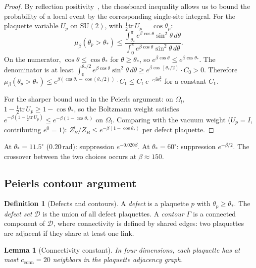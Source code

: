 \documentclass[11pt]{article}
\newtheorem{lemma}[theorem]{Lemma}
\theoremstyle{definition}
\newtheorem{definition}[theorem]{Definition}
\newcommand{\SU}{\mathrm{SU}}
\newcommand{\tr}{\mathrm{tr}}
\begin{document}
\begin{proof}
By reflection positivity~\cite{OS78,FroehlichSimon}, the chessboard
inequality allows us to bound the probability of a local event by
the corresponding single-site integral.  For the plaquette variable
$U_p$ on $\SU(2)$, with $\frac{1}{2}\tr\,U_p=\cos\theta_p$:
\begin{equation}
\mu_\beta(\theta_p>\theta_*)
\le\frac{\int_{\theta_*}^\pi
e^{\beta\cos\theta}\sin^2\theta\,d\theta}
{\int_0^\pi e^{\beta\cos\theta}\sin^2\theta\,d\theta}.
\end{equation}
On the numerator, $\cos\theta\le\cos\theta_*$ for
$\theta\ge\theta_*$, so
$e^{\beta\cos\theta}\le e^{\beta\cos\theta_*}$.
The denominator is at least
$\int_0^{\theta_*/2}e^{\beta\cos\theta}\sin^2\theta\,d\theta
\ge e^{\beta\cos(\theta_*/2)}\cdot C_0>0$.
Therefore
$\mu_\beta(\theta_p>\theta_*)
\le e^{\beta(\cos\theta_*-\cos(\theta_*/2))}\cdot C_1
\le C_1\,e^{-c\beta\theta_*^2}$ for a constant $C_1$.

For the sharper bound used in the Peierls argument:
on $\Omega_l$, $1-\frac{1}{2}\tr\,U_p\ge 1-\cos\theta_*$, so the
Boltzmann weight satisfies
$e^{-\beta(1-\frac{1}{2}\tr\,U_p)}
\le e^{-\beta(1-\cos\theta_*)}$ on $\Omega_l$.  Comparing with the
vacuum weight ($U_p=I$, contributing $e^0=1$):
$Z_B^l/Z_B\le e^{-\beta(1-\cos\theta_*)}$ per defect plaquette.
\end{proof}

At $\theta_*=11.5^\circ$ ($0.20$\,rad): suppression
$e^{-0.020\beta}$.  At $\theta_*=60^\circ$: suppression $e^{-\beta/2}$.
The crossover between the two choices occurs at $\beta\approx 150$.

\subsection{Peierls contour argument}\label{subsec:peierls}

\begin{definition}[Defects and contours]\label{def:contour}
A \emph{defect} is a plaquette $p$ with $\theta_p\ge\theta_*$.  The
\emph{defect set} $\mathcal{D}$ is the union of all defect plaquettes.
A \emph{contour} $\Gamma$ is a connected component of $\mathcal{D}$,
where connectivity is defined by shared edges: two plaquettes are
adjacent if they share at least one link.
\end{definition}

\begin{lemma}[Connectivity constant]\label{lem:conn}
In four dimensions, each plaquette has at most $c_{\mathrm{conn}}=20$
neighbors in the plaquette adjacency graph.
\end{lemma}
\end{document}
